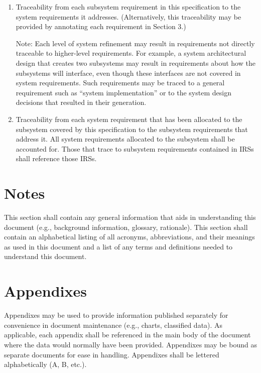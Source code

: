 \documentclass{fidata-report-template}
\begin{document}
\begin{enumerate}
\itemsep1pt\parskip0pt
\item
  Traceability from each subsystem requirement in this specification to
  the system requirements it addresses. (Alternatively, this
  traceability may be provided by annotating each requirement in Section
  3.)

  Note: Each level of system refinement may result in
  requirements not directly traceable to higher-level requirements. For
  example, a system architectural design that creates two subsystems may
  result in requirements about how the subsystems will interface, even
  though these interfaces are not covered in system requirements. Such
  requirements may be traced to a general requirement such as ``system
  implementation'' or to the system design decisions that resulted in
  their generation.
\item
  Traceability from each system requirement that has been allocated to
  the subsystem covered by this specification to the subsystem
  requirements that address it. All system requirements allocated to the
  subsystem shall be accounted for. Those that trace to subsystem
  requirements contained in IRSs shall reference those IRSs.
\end{enumerate}

\section{Notes}

This section shall contain any general information that aids in
understanding this document (e.g., background information, glossary,
rationale). This section shall contain an alphabetical listing of all
acronyms, abbreviations, and their meanings as used in this document and
a list of any terms and definitions needed to understand this document.

\appendix

\section{Appendixes}

Appendixes may be used to provide information published separately for
convenience in document maintenance (e.g., charts, classified data). As
applicable, each appendix shall be referenced in the main body of the
document where the data would normally have been provided. Appendixes
may be bound as separate documents for ease in handling. Appendixes
shall be lettered alphabetically (A, B, etc.).
\end{document}
